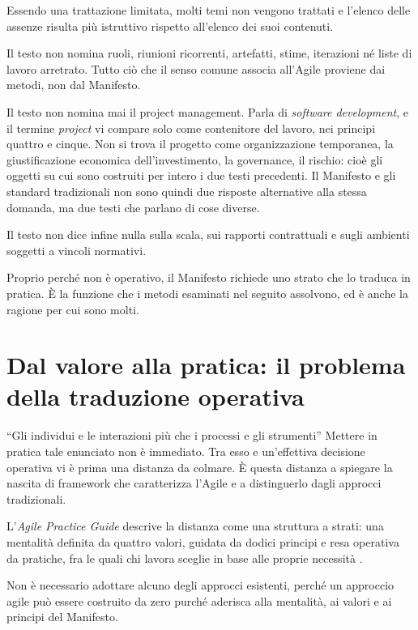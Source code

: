 Essendo una trattazione limitata, molti temi non vengono trattati e l'elenco delle
assenze risulta pi\`u istruttivo rispetto all'elenco dei suoi contenuti.

Il testo non nomina ruoli, riunioni ricorrenti, artefatti, stime, iterazioni
n\'e liste di lavoro arretrato. Tutto ci\`o che il senso comune associa
all'Agile proviene dai metodi, non dal Manifesto.

Il testo non nomina mai il project management. Parla di \emph{software
development}, e il termine \emph{project} vi compare solo come contenitore del
lavoro, nei principi quattro e cinque. Non si trova il progetto come
organizzazione temporanea, la giustificazione economica dell'investimento, la
governance, il rischio: cio\`e gli oggetti su cui sono costruiti per intero i
due testi precedenti. Il Manifesto e gli standard tradizionali non
sono quindi due risposte alternative alla stessa domanda, ma due testi che
parlano di cose diverse.

Il testo non dice infine nulla sulla scala, sui rapporti contrattuali e sugli
ambienti soggetti a vincoli normativi.

Proprio perch\'e non \`e operativo, il Manifesto richiede uno strato che lo
traduca in pratica. \`E la funzione che i metodi esaminati nel seguito
assolvono, ed \`e anche la ragione per cui sono molti.

\section{Dal valore alla pratica: il problema della traduzione operativa}
\label{sec:operativizzazione}

``Gli individui e le interazioni pi\`u che i processi e gli strumenti''
Mettere in pratica tale enunciato non \`e immediato. Tra esso e un'effettiva 
decisione operativa vi \`e prima una distanza da colmare. \`E questa
distanza a spiegare la nascita di framework che caratterizza l'Agile e a
distinguerlo dagli approcci tradizionali.

L'\emph{Agile Practice Guide} descrive la distanza come una struttura a strati:
una mentalit\`a definita da quattro valori, guidata da dodici principi e resa
operativa da pratiche, fra le quali chi lavora sceglie in base alle proprie
necessit\`a \cite{agilepracticeguide2}.

Non \`e necessario adottare
alcuno degli approcci esistenti, perch\'e un approccio agile pu\`o essere
costruito da zero purch\'e aderisca alla mentalit\`a, ai valori e ai principi
del Manifesto.

